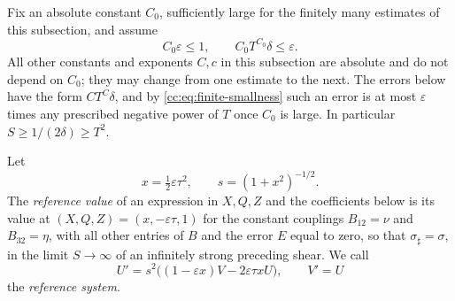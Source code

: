 Fix an absolute constant $C_0$, sufficiently large for the finitely
many estimates of this subsection, and assume
\begin{equation}\label{cc:eq:finite-smallness}
 C_0\varepsilon\le1,\qquad C_0T^{C_0}\delta\le\varepsilon .
\end{equation}
All other constants and exponents $C,c$ in this subsection are
absolute and do not depend on $C_0$; they may change from one estimate
to the next. The errors below have the form $CT^C\delta$, and by
\eqref{cc:eq:finite-smallness} such an error is at most $\varepsilon$
times any prescribed negative power of $T$ once $C_0$ is large. In
particular $S\ge1/(2\delta)\ge T^2$.

Let
\[
 x=\tfrac12\varepsilon\tau^2,\qquad s=(1+x^2)^{-1/2}.
\]
The \emph{reference value} of an expression in $X,Q,Z$ and the
coefficients below is its value at $(X,Q,Z)=(x,-\varepsilon\tau,1)$
for the constant couplings $B_{12}=\nu$ and $B_{32}=\eta$, with all
other entries of $B$ and the error $E$ equal to zero, so that
$\sigma_\sharp=\sigma$, in the limit $S\to\infty$ of an infinitely
strong preceding shear. We call
\begin{equation}\label{cc:eq:model-system}
 U'=s^2\bigl((1-\varepsilon x)V-2\varepsilon\tau xU\bigr),\qquad V'=U
\end{equation}
the \emph{reference system}.

